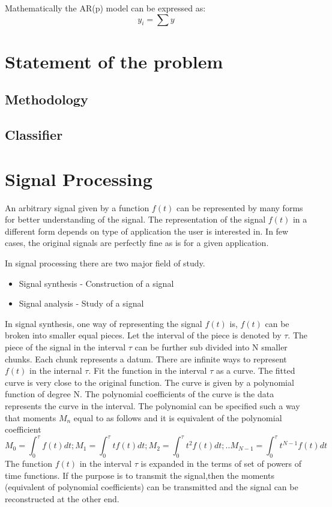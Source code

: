 \documentclass[paper=a4, fontsize=11pt,twoside]{scrartcl}		%
\begin{document}
Mathematically the AR(p) model can be expressed as:
\begin{equation}
y_i = \sum{y}
\end{equation}


\section{Statement of the problem}


\subsection{Methodology}


\subsection{Classifier}






\section{Signal Processing}
An arbitrary signal given by a function $f(t)$ can be represented by many forms for better understanding of the signal. The representation of the signal $f(t)$ in a different form depends on type of application the user is interested in. In few cases, the original signals are perfectly fine as is for a given application.

In signal processing there are two major field of study.
\begin{itemize}
  \item  {Signal synthesis - Construction of a signal}
  \item  {Signal analysis - Study of a signal}
\end{itemize}

In signal synthesis, one way of representing the signal $f(t)$ is, $f(t)$ can be broken into smaller equal pieces. Let the interval of the piece is denoted by $\tau$. The piece of the signal in the interval $\tau$ can be further sub divided into N smaller chunks. Each chunk represents a datum. There are infinite ways to represent $f(t)$ in the internal $\tau$. Fit the function in the interval $\tau$ as a curve. The fitted curve is very close to the original function. The curve is given by a polynomial function of degree N. The polynomial coefficients of the curve is the data represents the curve in the interval.  The polynomial can be specified such a way that moments ${M_n}$ equal to as follows and it is equivalent of the polynomial coefficient
\begin{equation*}
M_0 = \int_{0}^{\tau}{f(t)dt};M_1 = \int_{0}^{\tau}{tf(t)dt};M_2 = \int_{0}^{\tau}{t^2f(t)dt};..M_{N-1} = \int_{0}^{\tau}t^{N-1}{f(t)dt}
\end{equation*}
The function $f(t)$ in the interval $\tau$ is expanded in the terms of set of powers of time functions.
If the purpose is to transmit the signal,then the moments (equivalent of polynomial coefficients) can be transmitted and the signal can be reconstructed at the other end.
\end{document}
